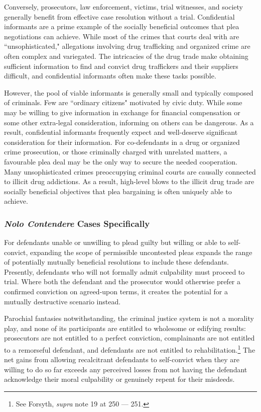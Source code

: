 Conversely, prosecutors, law enforcement, victims, trial witnesses, and society generally benefit from effective case resolution without a trial. Confidential informants are a prime example of the socially beneficial outcomes that plea negotiations can achieve. While most of the crimes that courts deal with are ``unsophisticated," allegations involving drug trafficking and organized crime are often complex and variegated. The intricacies of the drug trade make obtaining sufficient information to find and convict drug traffickers and their suppliers difficult, and confidential informants often make these tasks possible.

However, the pool of viable informants is generally small and typically composed of criminals. Few are ``ordinary citizens" motivated by civic duty. While some may be willing to give information in exchange for financial compensation or some other extra-legal consideration, informing on others can be dangerous. As a result, confidential informants frequently expect and well-deserve significant consideration for their information. For co-defendants in a drug or organized crime prosecution, or those criminally charged with unrelated matters, a favourable plea deal may be the only way to secure the needed cooperation. Many unsophisticated crimes preoccupying criminal courts are causally connected to illicit drug addictions. As a result, high-level blows to the illicit drug trade are socially beneficial objectives that plea bargaining is often uniquely able to achieve. 

\subsubsection{\textit{Nolo Contendere} Cases Specifically}

For defendants unable or unwilling to plead guilty but willing or able to self-convict, expanding the scope of permissible uncontested pleas expands the range of potentially mutually beneficial resolutions to include these defendants. Presently, defendants who will not formally admit culpability must proceed to trial. Where both the defendant and the prosecutor would otherwise prefer a confirmed conviction on agreed-upon terms, it creates the potential for a mutually destructive scenario instead.

Parochial fantasies notwithstanding, the criminal justice system is not a morality play, and none of its participants are entitled to wholesome or edifying results: prosecutors are not entitled to a perfect conviction, complainants are not entitled to a remorseful defendant, and defendants are not entitled to rehabilitation.\footnote{See Forsyth, \textit{supra} note 19 at 250 — 251.} The net gains from allowing recalcitrant defendants to self-convict when they are willing to do so far exceeds any perceived losses from not having the defendant acknowledge their moral culpability or genuinely repent for their misdeeds.

